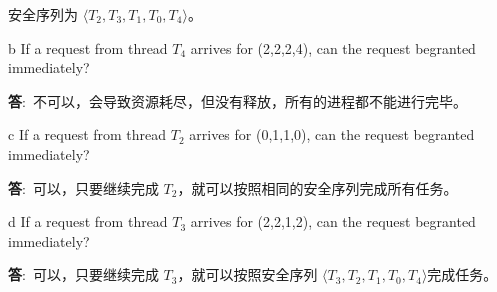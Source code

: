 \documentclass[12pt,a4paper]{article}
\newenvironment{problems}{\begin{list}{}{\renewcommand{\makelabel}[1]{\textbf{##1}\hfil}}}{\end{list}}
\newenvironment{steps}{\begin{list}{}{\renewcommand{\makelabel}[1]{##1.\hfil}}}{\end{list}}
\providecommand{\ans}{\textbf{答}:~}
\begin{document}
\begin{problems}
\begin{steps}
      安全序列为 $\langle T_2,T_3,T_1,T_0,T_4 \rangle$。
       \item[b] If a request from thread $T_4$ arrives for (2,2,2,4), can the request begranted immediately?
       
       \ans 不可以，会导致资源耗尽，但没有释放，所有的进程都不能进行完毕。
       \item[c] If a request from thread $T_2$ arrives for (0,1,1,0), can the request begranted immediately?
       
       \ans 可以，只要继续完成 $T_2$，就可以按照相同的安全序列完成所有任务。
       \item[d] If a request from thread $T_3$ arrives for (2,2,1,2), can the request begranted immediately?
       
       \ans 可以，只要继续完成 $T_3$，就可以按照安全序列 $\langle T_3,T_2,T_1,T_0,T_4 \rangle$完成任务。
   \end{steps}
\end{problems}
\end{document}
